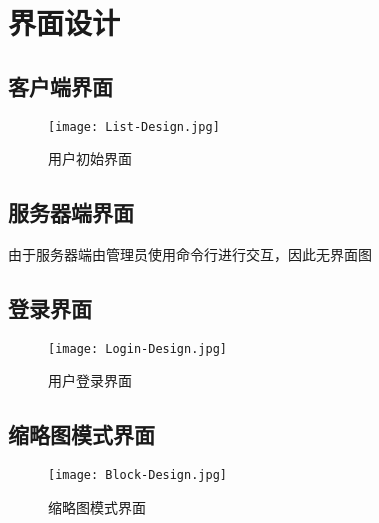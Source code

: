\chapter{界面设计}
    \section{客户端界面}

        \begin{figure}
            \centering
            \texttt{[image: List-Design.jpg]}
            \caption{用户初始界面}\label{fig:noted-figure}
        \end{figure}

    \section{服务器端界面}
        由于服务器端由管理员使用命令行进行交互，因此无界面图

    \section{登录界面}
        \begin{figure}
            \centering
            \texttt{[image: Login-Design.jpg]}
            \caption{用户登录界面}\label{fig:noted-figure}
        \end{figure}

    \section{缩略图模式界面}
        \begin{figure}
            \centering
            \texttt{[image: Block-Design.jpg]}
            \caption{缩略图模式界面}\label{fig:noted-figure}
        \end{figure}
